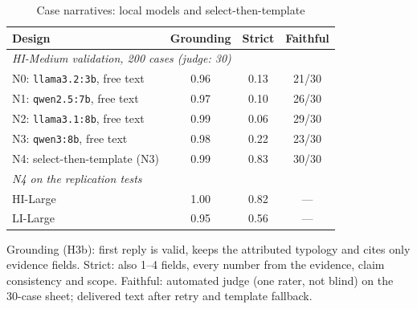 \begin{table}[!t]
\centering
\caption{Case narratives: local models and select-then-template}
\label{tab:narrative}
\footnotesize
\setlength{\tabcolsep}{4pt}
\begin{tabular}{lccc}
\hline
Design & Grounding & Strict & Faithful \\
\hline
\multicolumn{4}{l}{\emph{HI-Medium validation, 200 cases (judge: 30)}} \\
N0: \texttt{llama3.2:3b}, free text & 0.96 & 0.13 & 21/30 \\
N1: \texttt{qwen2.5:7b}, free text & 0.97 & 0.10 & 26/30 \\
N2: \texttt{llama3.1:8b}, free text & 0.99 & 0.06 & 29/30 \\
N3: \texttt{qwen3:8b}, free text & 0.98 & 0.22 & 23/30 \\
N4: select-then-template (N3) & 0.99 & 0.83 & 30/30 \\
\hline
\multicolumn{4}{l}{\emph{N4 on the replication tests}} \\
HI-Large & 1.00 & 0.82 & --- \\
LI-Large & 0.95 & 0.56 & --- \\
\hline
\end{tabular}
\par\smallskip\parbox{\linewidth}{\scriptsize Grounding (H3b): first reply is valid, keeps the attributed typology and cites only evidence fields. Strict: also 1--4 fields, every number from the evidence, claim consistency and scope. Faithful: automated judge (one rater, not blind) on the 30-case sheet; delivered text after retry and template fallback.}
\end{table}
